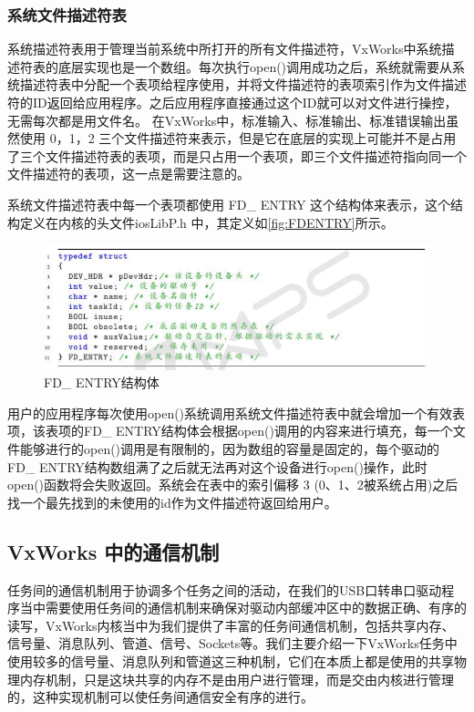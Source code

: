 \subsubsection{系统文件描述符表}
	系统描述符表用于管理当前系统中所打开的所有文件描述符，VxWorks中系统描述符表的底层实现也是一个数组。每次执行open()调用成功之后，系统就需要从系统描述符表中分配一个表项给程序使用，并将文件描述符的表项索引作为文件描述符的ID返回给应用程序。之后应用程序直接通过这个ID就可以对文件进行操控，无需每次都是用文件名。
	在VxWorks中，标准输入、标准输出、标准错误输出虽然使用 0，1，2 三个文件描述符来表示，但是它在底层的实现上可能并不是占用了三个文件描述符表的表项，而是只占用一个表项，即三个文件描述符指向同一个文件描述符的表项\cite{VxWorks内核解读}\cite{An2003Implementation}，这一点是需要注意的。
		
	
系统文件描述符表中每一个表项都使用 FD\_ ENTRY 这个结构体来表示，这个结构定义在内核的头文件iosLibP.h 中，其定义如\autoref{fig:FDENTRY}所示。


\begin{figure}[!h]
\centering
\includegraphics[width=1.0\textwidth]{./graphics/FDENTRY.pdf}
\caption{FD\_ ENTRY结构体}\label{fig:FDENTRY}
\end{figure}


用户的应用程序每次使用open()系统调用系统文件描述符表中就会增加一个有效表项，该表项的FD\_ ENTRY结构体会根据open()调用的内容来进行填充，每一个文件能够进行的open()调用是有限制的，因为数组的容量是固定的，每个驱动的FD\_ ENTRY结构数组满了之后就无法再对这个设备进行open()操作，此时 open()函数将会失败返回\cite{VxWorks内核解读}。系统会在表中的索引偏移 3 (0、1、2被系统占用)之后找一个最先找到的未使用的id作为文件描述符返回给用户。
	
\subsection{VxWorks 中的通信机制}
	
	任务间的通信机制用于协调多个任务之间的活动，在我们的USB口转串口驱动程序当中需要使用任务间的通信机制来确保对驱动内部缓冲区中的数据正确、有序的读写，VxWorks内核当中为我们提供了丰富的任务间通信机制，包括共享内存、信号量、消息队列、管道、信号、Sockets等。我们主要介绍一下VxWorks任务中使用较多的信号量、消息队列和管道这三种机制，它们在本质上都是使用的共享物理内存机制，只是这块共享的内存不是由用户进行管理，而是交由内核进行管理的，这种实现机制可以使任务间通信安全有序的进行\cite{胡明民2012基于实时操作系统}\cite{冯云贺2014基于}。


